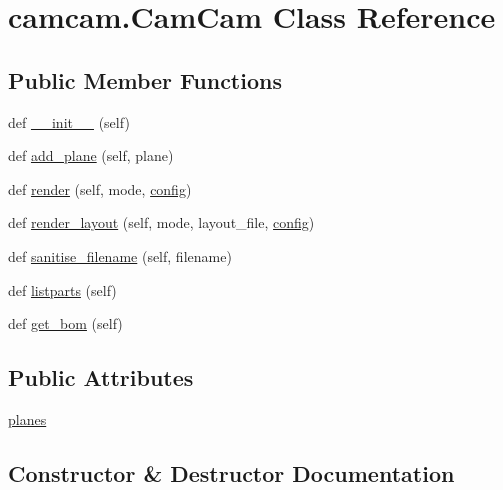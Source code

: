 \hypertarget{classcamcam_1_1_cam_cam}{}\section{camcam.\+Cam\+Cam Class Reference}
\label{classcamcam_1_1_cam_cam}
\subsection*{Public Member Functions}
\begin{DoxyCompactItemize}
\item 
def \hyperlink{classcamcam_1_1_cam_cam_af4e79f86f944d76fbb2e8b369d3ee206}{\+\_\+\+\_\+init\+\_\+\+\_\+} (self)
\item 
def \hyperlink{classcamcam_1_1_cam_cam_a98153a1dbd08286b0a8e2bd8c26a8cf1}{add\+\_\+plane} (self, plane)
\item 
def \hyperlink{classcamcam_1_1_cam_cam_a67c7d684131d923d4eca80dc585f45d4}{render} (self, mode, \hyperlink{namespacecamcam_added01231f61d35e10fa48a4cdeede8a}{config})
\item 
def \hyperlink{classcamcam_1_1_cam_cam_a9df1eca09309d548f366802eb78643aa}{render\+\_\+layout} (self, mode, layout\+\_\+file, \hyperlink{namespacecamcam_added01231f61d35e10fa48a4cdeede8a}{config})
\item 
def \hyperlink{classcamcam_1_1_cam_cam_a6e141484cb4846a485431bfea419001a}{sanitise\+\_\+filename} (self, filename)
\item 
def \hyperlink{classcamcam_1_1_cam_cam_a8cb2fc8c85c9da7fc85c0bdbdfc1177e}{listparts} (self)
\item 
def \hyperlink{classcamcam_1_1_cam_cam_a04d01da90dc3b5c2949604c60f732090}{get\+\_\+bom} (self)
\end{DoxyCompactItemize}
\subsection*{Public Attributes}
\begin{DoxyCompactItemize}
\item 
\hyperlink{classcamcam_1_1_cam_cam_af7e60c4dabd6dcfab7ca2d31e070c2c2}{planes}
\end{DoxyCompactItemize}


\subsection{Constructor \& Destructor Documentation}
\hypertarget{classcamcam_1_1_cam_cam_af4e79f86f944d76fbb2e8b369d3ee206}{}
